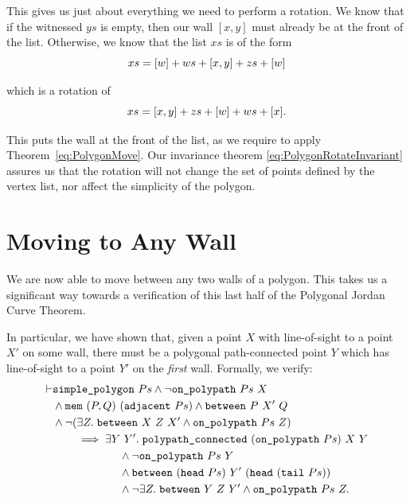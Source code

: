 This gives us just about everything we need to perform a rotation. We know that if the witnessed $ys$ is empty, then our wall $[x,y]$ must already be at the front of the list. Otherwise, we know that the list $xs$ is of the form
\begin{displaymath}
  xs = [w] + ws + [x,y] + zs + [w]
\end{displaymath}

which is a rotation of
\begin{displaymath}
  xs = [x,y] + zs + [w] + ws + [x].
\end{displaymath}

This puts the wall at the front of the list, as we require to apply Theorem~\ref{eq:PolygonMove}. Our invariance theorem \eqref{eq:PolygonRotateInvariant} assures us that the rotation will not change the set of points defined by the vertex list, nor affect the simplicity of the polygon.

\section{Moving to Any Wall}
We are now able to move between any two walls of a polygon. This takes us a significant way towards a verification of this last half of the Polygonal Jordan Curve Theorem. 

In particular, we have shown that, given a point $X$ with line-of-sight to a point $X'$ on some wall, there must be a polygonal path-connected point $Y$ which has line-of-sight to a point $Y'$ on the \emph{first} wall. Formally, we verify:
\begin{equation*}
  \begin{split}
\vdash    &\texttt{simple\_polygon}\ Ps \wedge \neg\texttt{on\_polypath}\ Ps\ X\\
    &\wedge \texttt{mem}\ (P,Q)\ (\texttt{adjacent}\ Ps) \wedge \texttt{between}\ P\ X'\ Q\\
    &\wedge\neg(\exists Z.\; \texttt{between}\ X\ Z\ X' \wedge \texttt{on\_polypath}\ Ps\ Z)\\
    &\qquad\implies \exists Y\ Y'.\; \texttt{polypath\_connected}\ (\texttt{on\_polypath}\ Ps)\ X\ Y\\
    &\qquad\qquad\qquad\wedge\neg\texttt{on\_polypath}\ Ps\ Y\\
    &\qquad\qquad\qquad\wedge \texttt{between}\ (\texttt{head}\ Ps)\ Y'\ (\texttt{head}\ (\texttt{tail}\ Ps))\\
    &\qquad\qquad\qquad\wedge \neg\exists Z.\; \texttt{between}\ Y\ Z\ Y' \wedge \texttt{on\_polypath}\ Ps\ Z.
  \end{split}
\end{equation*}

